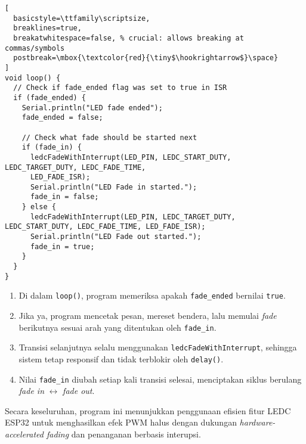 \begin{lstlisting}[
  basicstyle=\ttfamily\scriptsize,
  breaklines=true,
  breakatwhitespace=false, % crucial: allows breaking at commas/symbols
  postbreak=\mbox{\textcolor{red}{\tiny$\hookrightarrow$}\space}
]
void loop() {
  // Check if fade_ended flag was set to true in ISR
  if (fade_ended) {
    Serial.println("LED fade ended");
    fade_ended = false;

    // Check what fade should be started next
    if (fade_in) {
      ledcFadeWithInterrupt(LED_PIN, LEDC_START_DUTY, LEDC_TARGET_DUTY, LEDC_FADE_TIME, 
      LED_FADE_ISR);
      Serial.println("LED Fade in started.");
      fade_in = false;
    } else {
      ledcFadeWithInterrupt(LED_PIN, LEDC_TARGET_DUTY, LEDC_START_DUTY, LEDC_FADE_TIME, LED_FADE_ISR);
      Serial.println("LED Fade out started.");
      fade_in = true;
    }
  }
}
\end{lstlisting}


\begin{enumerate}
    \item Di dalam \texttt{loop()}, program memeriksa apakah \texttt{fade\_ended} bernilai \texttt{true}.
    \item Jika ya, program mencetak pesan, mereset bendera, lalu memulai \textit{fade} berikutnya sesuai arah yang ditentukan oleh \texttt{fade\_in}.
    \item Transisi selanjutnya selalu menggunakan \texttt{ledcFadeWithInterrupt}, sehingga sistem tetap responsif dan tidak terblokir oleh \texttt{delay()}.
    \item Nilai \texttt{fade\_in} diubah setiap kali transisi selesai, menciptakan siklus berulang \textit{fade in} $\leftrightarrow$ \textit{fade out}.
\end{enumerate}

Secara keseluruhan, program ini menunjukkan penggunaan efisien fitur LEDC ESP32 untuk menghasilkan efek PWM halus dengan dukungan \textit{hardware-accelerated fading} dan penanganan berbasis interupsi.

